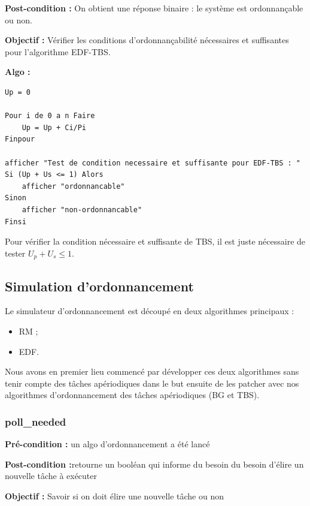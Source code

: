 				\textbf{Post-condition :} On obtient une réponse binaire : le système est ordonnançable ou non.
				
				\textbf{Objectif :} Vérifier les conditions d'ordonnançabilité nécessaires et suffisantes pour l'algorithme EDF-TBS.
				
				\textbf{Algo :}
					\begin{lstlisting}
Up = 0

Pour i de 0 a n Faire
    Up = Up + Ci/Pi
Finpour
					
afficher "Test de condition necessaire et suffisante pour EDF-TBS : "
Si (Up + Us <= 1) Alors
	afficher "ordonnancable"
Sinon
	afficher "non-ordonnancable"
Finsi
					\end{lstlisting}
					
					Pour vérifier la condition nécessaire et suffisante de TBS, il est juste nécessaire de tester $U_p + U_s \le 1 $.
					
	
		\subsection{Simulation d'ordonnancement}
			Le simulateur d'ordonnancement est découpé en deux algorithmes principaux :
			\begin{itemize}
				\item RM ;
				\item EDF.
			\end{itemize}
			
			Nous avons en premier lieu commencé par développer ces deux algorithmes sans tenir compte des tâches apériodiques dans le but ensuite de les \og patcher \fg avec nos algorithmes d'ordonnancement des tâches apériodiques (BG et TBS).
			
			
			\subsubsection{poll\_needed}
				\label{sec:algo_poll}

				\textbf{Pré-condition :} un algo d'ordonnancement a été lancé
				
				\textbf{Post-condition :}retourne un booléan qui informe du besoin du besoin d'élire un nouvelle tâche à exécuter
				
				\textbf{Objectif :} Savoir si on doit élire une nouvelle tâche ou non
				
